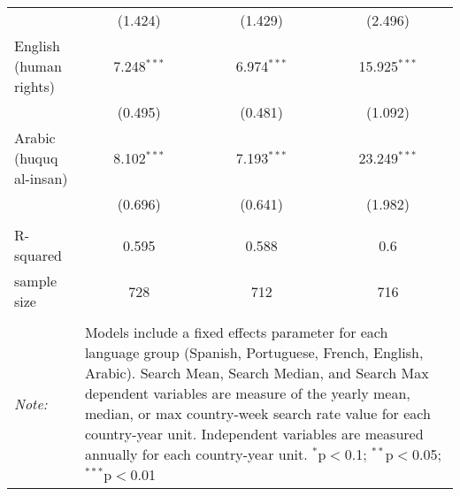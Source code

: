 \begin{table}[!htbp]
\begin{tabular}{@{\extracolsep{5pt}}lccc}
  & (1.424) & (1.429) & (2.496) \\ 
  English (human rights) & 7.248$^{***}$ & 6.974$^{***}$ & 15.925$^{***}$ \\ 
  & (0.495) & (0.481) & (1.092) \\ 
  Arabic (huquq al-insan) & 8.102$^{***}$ & 7.193$^{***}$ & 23.249$^{***}$ \\ 
  & (0.696) & (0.641) & (1.982) \\ 
 \hline \\[-1.8ex] 
R-squared  & 0.595 & 0.588 & 0.6 \\ 
sample size  & 728 & 712 & 716 \\ 
\hline 
\hline \\[-1.8ex] 
\textit{Note:}  & \multicolumn{3}{l}{\parbox[t]{8cm}{Models include a fixed effects parameter for each language group (Spanish, Portuguese, French, English, Arabic). Search Mean, Search Median, and Search Max dependent variables are measure of the yearly mean, median, or max country-week search rate value for each country-year unit. Independent variables are measured annually for each country-year unit. $^{*}$p$<$0.1; $^{**}$p$<$0.05; $^{***}$p$<$0.01}} \\ 
\end{tabular} 
\end{table} 
